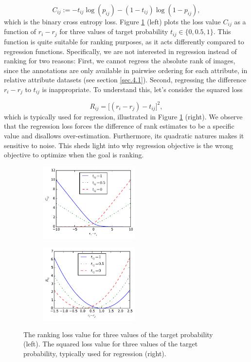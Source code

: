 \documentclass[runningheads]{llncs}
\begin{document}
\begin{equation}
C_{ij} := - t_{ij} \log (p_{ij}) - (1 - t_{ij}) \log (1 - p_{ij}),
\label{eq2}
\end{equation}
which is the binary cross entropy loss.
Figure \ref{fig.2} (left) plots the loss value $C_{ij}$ as a function of $r_i - r_j$ for three values of target probability $t_{ij} \in \{0, 0.5, 1\}$. This function is quite suitable for ranking purposes, as it acts differently compared to regression functions.
Specifically, we are not interested in regression instead of ranking for two reasons: First, we cannot regress the absolute rank of images, since the annotations are only available in pairwise ordering for each attribute, in relative attribute datasets (see section \ref{sec.4.1}). Second, regressing the difference $r_i - r_j$ to $t_{ij}$ is inappropriate. To understand this, let's consider the squared loss

\begin{equation}
R_{ij} = \big[(r_i - r_j) - t_{ij}\big]^2,
\end{equation}
which is typically used for regression, illustrated in Figure \ref{fig.2} (right). We observe that the regression loss forces the difference of rank estimates to be a specific value and disallows over-estimation. Furthermore, its quadratic natures makes it %
sensitive to noise. This sheds light into why regression objective is the wrong objective to optimize when the goal is ranking.

\begin{figure}
    \centering
    \begin{subfigure}
        \centering
        \includegraphics[width=5cm]{fig2_2_fig3.pdf}
    \end{subfigure}
    \begin{subfigure}
        \centering
        \includegraphics[width=5cm]{fig2_2_fig3-reg.pdf}
    \end{subfigure}
    \caption{The ranking loss value for three values of the target probability (left). The squared loss value for three values of the target probability, typically used for regression (right).}
    \label{fig.2}
\end{figure}
\end{document}
